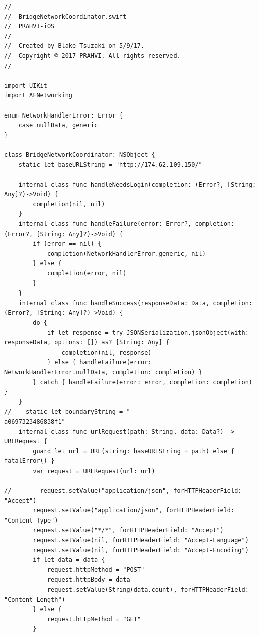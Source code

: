 \begin{lstlisting}
//
//  BridgeNetworkCoordinator.swift
//  PRAHVI-iOS
//
//  Created by Blake Tsuzaki on 5/9/17.
//  Copyright © 2017 PRAHVI. All rights reserved.
//

import UIKit
import AFNetworking

enum NetworkHandlerError: Error {
    case nullData, generic
}

class BridgeNetworkCoordinator: NSObject {
    static let baseURLString = "http://174.62.109.150/"
    
    internal class func handleNeedsLogin(completion: (Error?, [String: Any]?)->Void) {
        completion(nil, nil)
    }
    internal class func handleFailure(error: Error?, completion: (Error?, [String: Any]?)->Void) {
        if (error == nil) {
            completion(NetworkHandlerError.generic, nil)
        } else {
            completion(error, nil)
        }
    }
    internal class func handleSuccess(responseData: Data, completion: (Error?, [String: Any]?)->Void) {
        do {
            if let response = try JSONSerialization.jsonObject(with: responseData, options: []) as? [String: Any] {
                completion(nil, response)
            } else { handleFailure(error: NetworkHandlerError.nullData, completion: completion) }
        } catch { handleFailure(error: error, completion: completion) }
    }
//    static let boundaryString = "------------------------a0697323486838f1"
    internal class func urlRequest(path: String, data: Data?) -> URLRequest {
        guard let url = URL(string: baseURLString + path) else { fatalError() }
        var request = URLRequest(url: url)
        
//        request.setValue("application/json", forHTTPHeaderField: "Accept")
        request.setValue("application/json", forHTTPHeaderField: "Content-Type")
        request.setValue("*/*", forHTTPHeaderField: "Accept")
        request.setValue(nil, forHTTPHeaderField: "Accept-Language")
        request.setValue(nil, forHTTPHeaderField: "Accept-Encoding")
        if let data = data {
            request.httpMethod = "POST"
            request.httpBody = data
            request.setValue(String(data.count), forHTTPHeaderField: "Content-Length")
        } else {
            request.httpMethod = "GET"
        }
        

\end{lstlisting}
